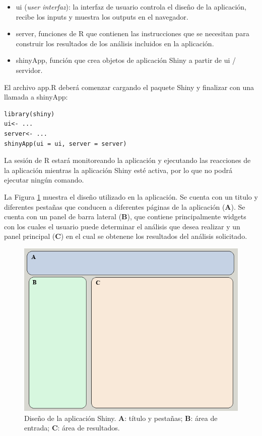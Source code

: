 \begin{itemize}
\item ui (\emph{user interfaz}): la interfaz de usuario controla el diseño de la aplicación, recibe los inputs y
muestra los outputs en el navegador.
\item server, funciones de R que contienen las instrucciones que se necesitan para construir los resultados de los análisis incluidos en la aplicación.
\item shinyApp, función que crea objetos de aplicación Shiny a partir de ui / servidor.
\end{itemize}


El archivo app.R deberá comenzar cargando el paquete Shiny y finalizar con una llamada a shinyApp:\\

\begin{lstlisting}[frame=single]
library(shiny)
ui<- ...
server<- ...
shinyApp(ui = ui, server = server)
\end{lstlisting}

La sesión de R estará monitoreando la aplicación y ejecutando las reacciones de la aplicación mientras la aplicación Shiny esté activa, por lo que no podrá ejecutar ningún comando.

La Figura \ref{fig:fig323} muestra el diseño utilizado en la aplicación. Se cuenta con un titulo y diferentes pestañas que conducen a diferentes páginas de la aplicación (\textbf{A}). Se cuenta con un panel de barra lateral (\textbf{B}), que contiene principalmente widgets con los cuales el usuario puede determinar el análisis que desea realizar y un panel principal (\textbf{C}) en el cual se obtenene los resultados del análisis solicitado.

\begin{figure}[h]
\begin{center}
\includegraphics[width=12cm]{./Graficos/figura6}
\end{center}
\caption{Diseño de la aplicación Shiny. \textbf{A}: título y pestañas; \textbf{B}: área de entrada; \textbf{C}: área de resultados.}
\label{fig:fig323}
\end{figure}

